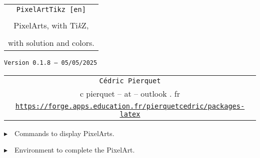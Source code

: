 \documentclass{article}
\def\TPversion{0.1.8}
\def\TPdate{05/05/2025}
\begin{document}
\pagestyle{fancy}

\thispagestyle{empty}

\vspace{2cm}

\begin{center}
	\begin{minipage}{0.75\linewidth}
	\begin{tcolorbox}[colframe=yellow,colback=yellow!15]
		\begin{center}
			\begin{tabular}{c}
				{\Huge \texttt{PixelArtTikz [en]}}\\
				\\
				{\LARGE PixelArts, with Ti\textit{k}Z}, \\
				\\
				{\LARGE with solution and colors.} \\
			\end{tabular}
			
			\medskip
			
			{\small \texttt{Version \TPversion{} -- \TPdate}}
		\end{center}
	\end{tcolorbox}
\end{minipage}
\end{center}

\vspace{0.5cm}

\begin{center}
	\begin{tabular}{c}
	\texttt{Cédric Pierquet}\\
	{\ttfamily c pierquet -- at -- outlook . fr}\\
	\texttt{\url{https://forge.apps.education.fr/pierquetcedric/packages-latex}}
\end{tabular}
\end{center}

\vspace{0.25cm}

{$\blacktriangleright$~~Commands to display PixelArts.}

\smallskip

{$\blacktriangleright$~~Environment to complete the PixelArt.}

\smallskip

\vspace{1cm}
\end{document}
